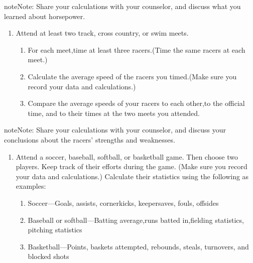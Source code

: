\documentclass[letterpaper,10pt,english,openany,oneside]{sphinxmanual}
\begin{document}
\begin{sphinxadmonition}{note}{Note:}
Share your calculations with your counselor, and discuss what you learned about horsepower.
\end{sphinxadmonition}
\begin{enumerate}
%
\setcounter{enumi}{1}
\item {} 
Attend at least two track, cross country, or swim meets.
\begin{enumerate}
%
\item {} 
For each meet,time at least three racers.(Time the same racers at each meet.)

\item {} 
Calculate the average speed of the racers you timed.(Make sure you record your data and calculations.)

\item {} 
Compare the average speeds of your racers to each other,to the official time, and to their times at the two meets you attended.

\end{enumerate}

\end{enumerate}

\begin{sphinxadmonition}{note}{Note:}
Share your calculations with your counselor, and discuss your conclusions about the racers’ strengths and weaknesses.
\end{sphinxadmonition}
\begin{enumerate}
%
\setcounter{enumi}{2}
\item {} 
Attend a soccer, baseball, softball, or basketball game. Then choose two players. Keep track of their efforts during the game. (Make sure you record your data and calculations.) Calculate their statistics using the following as examples:
\begin{enumerate}
%
\item {} 
Soccer—Goals, assists, cornerkicks, keepersaves, fouls, offsides

\item {} 
Baseball or softball—Batting average,runs batted in,fielding statistics, pitching statistics

\item {} 
Basketball—Points, baskets attempted, rebounds, steals, turnovers, and blocked shots

\end{enumerate}

\end{enumerate}
\end{document}
